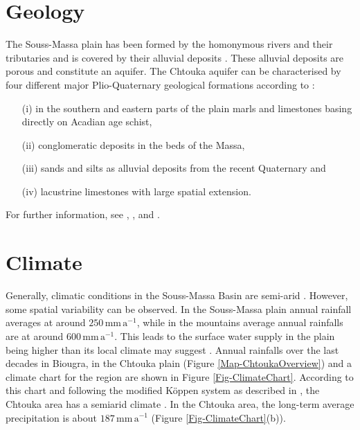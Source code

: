 \section{Geology}
\label{Sec-SouMaGeology}

The Souss-Massa plain has been formed by the homonymous rivers and their tributaries and is covered by their alluvial deposits \parencite{Hssaisoune.2017}. These alluvial deposits are porous and constitute an aquifer. The Chtouka aquifer can be characterised by four different major Plio-Quaternary geological formations according to \textcite{Malki.2017}: 
    \begin{itemize}
        \item[(i)] in the southern and eastern parts of the plain marls and limestones basing directly on Acadian age schist, 
        \item[(ii)] conglomeratic deposits in the beds of the Massa, 
        \item[(iii)] sands and silts as alluvial deposits from the recent Quaternary and
        \item[(iv)] lacustrine limestones with large spatial extension.
    \end{itemize}
For further information, see \cite{Choubert.1964}, \cite{Hssaisoune.2017}, \cite{Horn.2021} and \cite{Krimissa.2004}.

\section{Climate}
\label{Sec-SouMaClimate}

Generally, climatic conditions in the Souss-Massa Basin are semi-arid \parencite{Choukr.2017}. However, some spatial variability can be observed. In the Souss-Massa plain annual rainfall averages at around $250 \, \textrm{mm} \, \textrm{a}^{-1}$, while in the mountains average annual rainfalls are at around $600 \, \textrm{mm} \, \textrm{a}^{-1}$. This leads to the surface water supply in the plain being higher than its local climate may suggest \parencite{Hssaisoune.2017}. Annual rainfalls over the last decades in Biougra, in the Chtouka plain (Figure \ref{Map-ChtoukaOverview}) and a climate chart for the region are shown in Figure \ref{Fig-ClimateChart}. According to this chart and following the modified Köppen system as described in \cite{Critchfield.1983}, the Chtouka area has a semiarid climate \parencite{Choukr.2017}. In the Chtouka area, the long-term average precipitation is about $ 187 \, \textrm{mm} \, \textrm{a}^{-1}$ (Figure \ref{Fig-ClimateChart}(b)).

